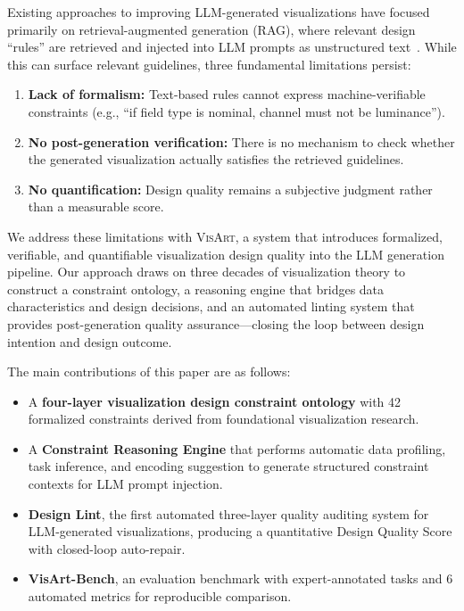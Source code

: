 \documentclass[final,5p,times,twocolumn]{elsarticle}
\newcommand{\sysname}{\textsc{VisArt}}
\newcommand{\eg}{e.g.}
\begin{document}
Existing approaches to improving LLM-generated visualizations have focused primarily on retrieval-augmented generation (RAG), where relevant design ``rules'' are retrieved and injected into LLM prompts as unstructured text~\cite{li2024lightva,lu2024insightlens}.
While this can surface relevant guidelines, three fundamental limitations persist:

\begin{enumerate}[label=(\arabic*)]
  \item \textbf{Lack of formalism:} Text-based rules cannot express machine-verifiable constraints (\eg{}, ``if field type is nominal, channel must not be luminance'').
  \item \textbf{No post-generation verification:} There is no mechanism to check whether the generated visualization actually satisfies the retrieved guidelines.
  \item \textbf{No quantification:} Design quality remains a subjective judgment rather than a measurable score.
\end{enumerate}

We address these limitations with \sysname{}, a system that introduces formalized, verifiable, and quantifiable visualization design quality into the LLM generation pipeline.
Our approach draws on three decades of visualization theory to construct a constraint ontology, a reasoning engine that bridges data characteristics and design decisions, and an automated linting system that provides post-generation quality assurance---closing the loop between design intention and design outcome.

The main contributions of this paper are as follows:
\begin{itemize}
  \item A \textbf{four-layer visualization design constraint ontology} with 42 formalized constraints derived from foundational visualization research.
  \item A \textbf{Constraint Reasoning Engine} that performs automatic data profiling, task inference, and encoding suggestion to generate structured constraint contexts for LLM prompt injection.
  \item \textbf{Design Lint}, the first automated three-layer quality auditing system for LLM-generated visualizations, producing a quantitative Design Quality Score with closed-loop auto-repair.
  \item \textbf{VisArt-Bench}, an evaluation benchmark with expert-annotated tasks and 6 automated metrics for reproducible comparison.
\end{itemize}
\end{document}
